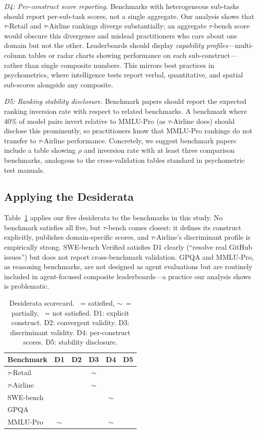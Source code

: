 \documentclass[sigconf]{acmart}
\newcommand{\cmark}{\ding{51}}
\newcommand{\xmark}{\ding{55}}
\newcommand{\pmark}{$\sim$}
\begin{document}
\textit{D4: Per-construct score reporting.} Benchmarks with heterogeneous sub-tasks should report per-sub-task scores, not a single aggregate. Our analysis shows that $\tau$-Retail and $\tau$-Airline rankings diverge substantially; an aggregate $\tau$-bench score would obscure this divergence and mislead practitioners who care about one domain but not the other. Leaderboards should display \emph{capability profiles}---multi-column tables or radar charts showing performance on each sub-construct---rather than single composite numbers. This mirrors best practices in psychometrics, where intelligence tests report verbal, quantitative, and spatial sub-scores alongside any composite.

\textit{D5: Ranking stability disclosure.} Benchmark papers should report the expected ranking inversion rate with respect to related benchmarks. A benchmark where 40\% of model pairs invert relative to MMLU-Pro (as $\tau$-Airline does) should disclose this prominently, so practitioners know that MMLU-Pro rankings do not transfer to $\tau$-Airline performance. Concretely, we suggest benchmark papers include a table showing $\rho$ and inversion rate with at least three comparison benchmarks, analogous to the cross-validation tables standard in psychometric test manuals.

\subsection{Applying the Desiderata}
Table~\ref{tab:scorecard} applies our five desiderata to the benchmarks in this study. No benchmark satisfies all five, but $\tau$-bench comes closest: it defines its construct explicitly, publishes domain-specific scores, and $\tau$-Airline's discriminant profile is empirically strong. SWE-bench Verified satisfies D1 clearly (``resolve real GitHub issues'') but does not report cross-benchmark validation. GPQA and MMLU-Pro, as reasoning benchmarks, are not designed as agent evaluations but are routinely included in agent-focused composite leaderboards---a practice our analysis shows is problematic.

\begin{table}[h]
\caption{Desiderata scorecard. \cmark~= satisfied, \pmark~= partially, \xmark~= not satisfied. D1: explicit construct. D2: convergent validity. D3: discriminant validity. D4: per-construct scores. D5: stability disclosure.}
\label{tab:scorecard}
\begin{tabular}{lccccc}
\toprule
Benchmark & D1 & D2 & D3 & D4 & D5 \\
\midrule
$\tau$-Retail & \cmark & \xmark & \pmark & \cmark & \xmark \\
$\tau$-Airline & \cmark & \xmark & \pmark & \cmark & \xmark \\
SWE-bench & \cmark & \xmark & \xmark & \pmark & \xmark \\
GPQA & \cmark & \xmark & \xmark & \xmark & \xmark \\
MMLU-Pro & \pmark & \xmark & \xmark & \pmark & \xmark \\
\bottomrule
\end{tabular}
\end{table}
\end{document}
